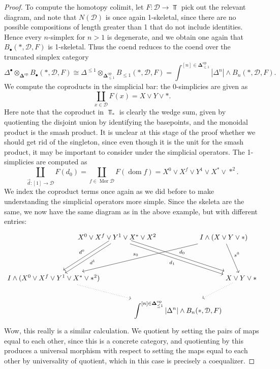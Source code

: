 \begin{proof}
	To compute the homotopy colimit, let $F : \mathcal{D}  \to \Top $ pick out the relevant diagram, and note that $N(\mathcal{D} )$ is once again 1-skeletal, since there are no possible compositions of length greater than 1 that do not include identities. Hence every $n$-simplex for $n>1$ is degenerate, and we obtain one again that $B_{\bullet} (*,\mathcal{D} ,F)$ is 1-skeletal. Thus the coend reduces to the coend over the truncated simplex category
	\[
		\Delta^{\bullet} \otimes_{\boldsymbol{\Delta} ^{\mathrm{op}} } B_{\bullet} (*,\mathcal{D} ,F)\cong \Delta^{\leq 1} \otimes_{\boldsymbol{\Delta} ^{\mathrm{op}} _{\leq 1} } B_{\leq 1} (*,\mathcal{D} ,F)=\int^{[n]\in\boldsymbol{\Delta} ^{\mathrm{op}}_{\leq 1}  } \left| \Delta^n \right| \wedge B_n(*,\mathcal{D} ,F)
	.\]
	We compute the coproducts in the simplicial bar: the 0-simplicies are given as
	\[
		\coprod_{x\in \mathcal{D} } F(x)=X\vee Y\vee*
	.\]
	Here note that the coproduct in $\Top _*$ is clearly the wedge sum, given by quotienting the disjoint union by identifying the basepoints, and the monoidal product is the smash product. It is unclear at this stage of the proof whether we should get rid of the singleton, since even though it is the unit for the smash product, it may be important to consider under the simplicial operators. The 1-simplicies are computed as
	\[
		\coprod_{\vec{d} : [1] \to \mathcal{D} } F(d_0)=\coprod_{f\in \operatorname{Mor} \mathcal{D} } F(\operatorname{dom} f)=X^0\vee X^f \vee Y^1 \vee X^* \vee *^2
	.\]
	We index the coproduct terms once again as we did before to make understanding the simplicial operators more simple. Since the skeleta are the same, we now have the same diagram as in the above example, but with different entries:
\[\begin{tikzcd}[row sep=2em, column sep=-4em]
	& {X^0\vee X^f\vee Y^1\vee X^*\vee X^2} && {I\wedge(X\vee Y\vee*)} \\
	\\
	{I\wedge(X^0\vee X^f\vee Y^1\vee X^* \vee*^2)} &&&& {X\vee Y \vee *} \\
	&& {\displaystyle{\int^{[n]\in\boldsymbol{\Delta}_{\leq 1}^{\mathrm{op}} }}\left|\Delta^n\right|\wedge B_n(*,\mathcal{D} ,F)}
	\arrow["{d^0}"', shift right, from=1-2, to=3-1]
	\arrow["{d^1}", shift left, from=1-2, to=3-1]
	\arrow["{d_0}", shift left, from=1-2, to=3-5]
	\arrow["{d_1}"', shift right, from=1-2, to=3-5]
	\arrow["{s_0}"', from=1-4, to=3-1]
	\arrow["{s^0}", from=1-4, to=3-5]
	\arrow[dotted, from=3-1, to=4-3]
	\arrow[dotted, from=3-5, to=4-3]
\end{tikzcd}\]
	Wow, this really is a similar calculation. We quotient by setting the pairs of maps equal to each other, since this is a concrete category, and quotienting by this produces a universal morphism with respect to setting the maps equal to each other by universality of quotient, which in this case is precisely a coequalizer.


\end{proof}
